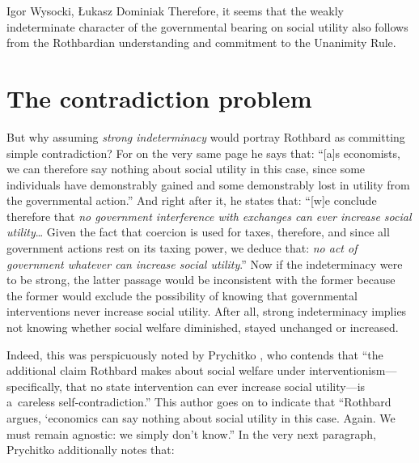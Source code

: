 \begin{artengenv}{Igor Wysocki, Łukasz Dominiak}
\parencite[][p.253]{rothbard_toward_2008} %
 Therefore, it seems that the weakly indeterminate character of the governmental bearing on social utility also follows from the Rothbardian understanding and commitment to the Unanimity Rule.



\section{The contradiction problem}

But why assuming \textit{strong indeterminacy} would portray Rothbard as committing simple contradiction? For on the very same page he says that: ``[a]s economists, we can therefore say nothing about social utility in this case, since some individuals have demonstrably gained and some demonstrably lost in utility from the governmental action.'' 
\parencite[][p.252]{rothbard_toward_2008} %
 And right after it, he states that: ``[w]e conclude therefore that \textit{no government interference with exchanges can ever increase social utility}… Given the fact that coercion is used for taxes, therefore, and since all government actions rest on its taxing power, we deduce that: \textit{no act of government whatever can increase social utility}.'' 
\parencite[][p.252]{rothbard_toward_2008} %
 Now if the indeterminacy were to be strong, the latter passage would be inconsistent with the former because the former would exclude the possibility of knowing that governmental interventions never increase social utility. After all, strong indeterminacy implies not knowing whether social welfare diminished, stayed unchanged or increased.



Indeed, this was perspicuously noted by Prychitko 
\parencite*[][p.575]{prychitko_formalism_1993}, %
 who contends that ``the additional claim Rothbard makes about social welfare under interventionism---specifically, that no state intervention can ever increase social utility---is a~careless self-contradiction.'' This author goes on to indicate that ``Rothbard argues, ‘economics can say nothing about social utility in this case. Again. We must remain agnostic: we simply don't know.'' In the very next paragraph, Prychitko 
\parencite*[][p.576]{prychitko_formalism_1993} %
 additionally notes that:




\end{artengenv}
